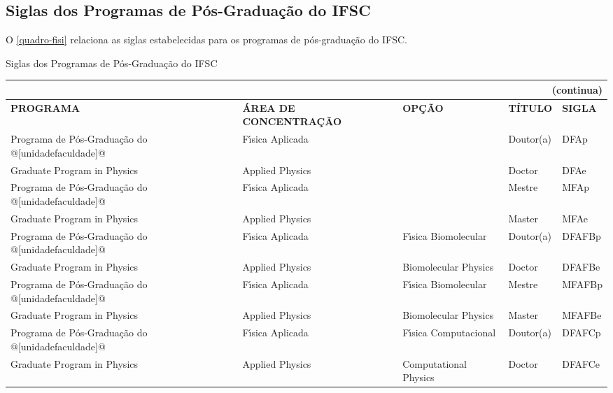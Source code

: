 \begin{apendicesenv}
\chapter{Siglas dos Programas de P\'os-Gradua\c{c}\~ao do IFSC}
O \autoref{quadro-fisi} relaciona as siglas estabelecidas para os programas de p\'os-gradua\c{c}\~ao do IFSC.
\begin{quadro}[htb] 
	\ABNTEXfontereduzida
	\caption[Siglas dos Programas de P\'os-Gradua\c{c}\~ao do IFSC]{Siglas dos Programas de P\'os-Gradua\c{c}\~ao do IFSC}
	\label{quadro-fisi}
	\begin{tabular}{|p{3.5cm}|p{3.5cm}|p{3.5cm}|p{1.5cm}|p{2.25cm}|}
	\multicolumn{5}{r}{{(continua)}} \\ 
    \hline
		\textbf{PROGRAMA} & \textbf{\'AREA DE CONCENTRA\c{C}\~AO} & \textbf{OP\c{C}\~AO} & \textbf{T\'ITULO} & \textbf{SIGLA}  \\
		\hline
		Programa de P\'os-Gradua\c{c}\~ao do @[unidadefaculdade]@& F\'{\i}sica Aplicada &  & Doutor(a) & DFAp\\
		Graduate Program in Physics & Applied Physics &  & Doctor & DFAe\\
		Programa de P\'os-Gradua\c{c}\~ao do @[unidadefaculdade]@& F\'{\i}sica Aplicada &  & Mestre & MFAp\\
		Graduate Program in Physics & Applied Physics &  & Master & MFAe\\
		Programa de P\'os-Gradua\c{c}\~ao do @[unidadefaculdade]@& F\'{\i}sica Aplicada & F\'{\i}sica Biomolecular & Doutor(a) & DFAFBp\\
		Graduate Program in Physics & Applied Physics & Biomolecular Physics & Doctor & DFAFBe\\
		Programa de P\'os-Gradua\c{c}\~ao do @[unidadefaculdade]@& F\'{\i}sica Aplicada & F\'{\i}sica Biomolecular & Mestre & MFAFBp\\
		Graduate Program in Physics & Applied Physics & Biomolecular Physics & Master & MFAFBe\\
		Programa de P\'os-Gradua\c{c}\~ao do @[unidadefaculdade]@& F\'{\i}sica Aplicada & F\'{\i}sica Computacional & Doutor(a) & DFAFCp\\
		Graduate Program in Physics & Applied Physics & Computational Physics & Doctor & DFAFCe\\		

	\end{tabular}
\end{quadro}


\end{apendicesenv}
